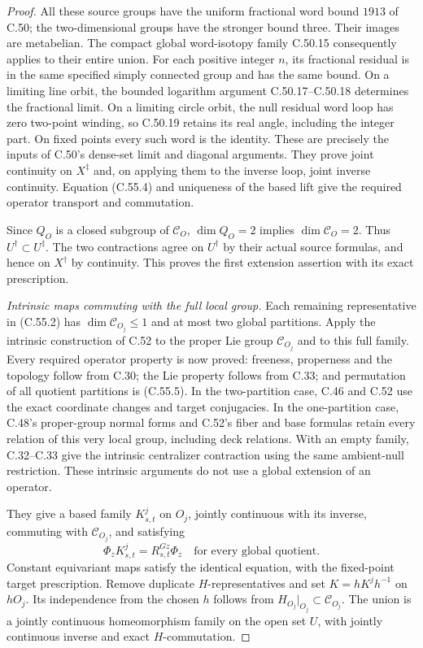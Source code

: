 \begin{proof}
All these source groups have the uniform fractional
word bound $1913$ of C.50; the two-dimensional groups
have the stronger bound three. Their images are
metabelian. The compact global word-isotopy family
C.50.15 consequently applies to their entire union.
For each positive integer $n$, its fractional residual
is in the same specified simply connected group and
has the same bound. On a limiting line orbit, the
bounded logarithm argument C.50.17--C.50.18 determines
the fractional limit. On a limiting circle orbit,
the null residual word loop has zero two-point winding,
so C.50.19 retains its real angle, including the
integer part. On fixed points every such word is the
identity. These are precisely the inputs of C.50's
dense-set limit and diagonal arguments. They prove
joint continuity on $X^\ddagger$ and, on applying them
to the inverse loop, joint inverse continuity.
Equation (C.55.4) and uniqueness of the based lift
give the required operator transport and commutation.

Since $Q_O$ is a closed subgroup of $\mathcal C_O$,
$\dim Q_O=2$ implies $\dim\mathcal C_O=2$. Thus
$U^\dagger\subset U^\ddagger$. The two contractions
agree on $U^\dagger$ by their actual source formulas,
and hence on $X^\dagger$ by continuity. This proves
the first extension assertion with its exact
prescription.

\emph{Intrinsic maps commuting with the full local group.}
Each remaining representative in (C.55.2) has
$\dim\mathcal C_{O_j}\leq1$ and at most two global
partitions. Apply the intrinsic construction of C.52
to the proper Lie group $\mathcal C_{O_j}$ and to this
full family. Every required operator property is now
proved: freeness, properness and the topology follow
from C.30; the Lie property follows from C.33; and
permutation of all quotient partitions is (C.55.5).
In the two-partition case, C.46 and C.52 use the exact
coordinate changes and target conjugacies. In the
one-partition case, C.48's proper-group normal forms
and C.52's fiber and base formulas retain every
relation of this very local group, including deck
relations. With an empty family, C.32--C.33 give the
intrinsic centralizer contraction using the same
ambient-null restriction. These intrinsic arguments
do not use a global extension of an operator.

They give a based family $K^j_{s,t}$ on $O_j$,
jointly continuous with its inverse, commuting with
$\mathcal C_{O_j}$, and satisfying
\[
              \Phi_z K^j_{s,t}=R^{Gz}_{s,t}\Phi_z
                  \quad\text{for every global quotient.}
                                                        \tag{C.55.7}
\]
Constant equivariant maps satisfy the identical
equation, with the fixed-point target prescription.
Remove duplicate $H$-representatives and set
$K=hK^jh^{-1}$ on $hO_j$. Its independence from the
chosen $h$ follows from $H_{O_j}|_{O_j}\subset
\mathcal C_{O_j}$. The union is a jointly continuous
homeomorphism family on the open set $U$, with
jointly continuous inverse and exact $H$-commutation.


\end{proof}
